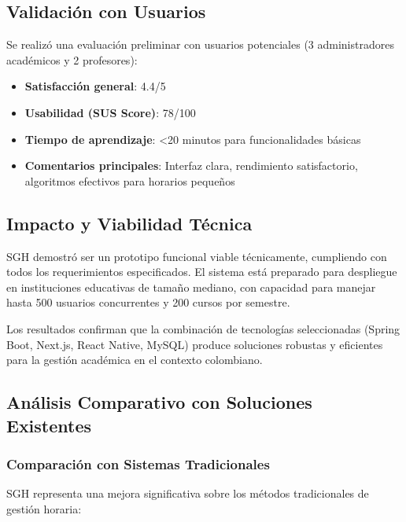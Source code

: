 \subsection{Validación con Usuarios}

Se realizó una evaluación preliminar con usuarios potenciales (3 administradores académicos y 2 profesores):

\begin{itemize}
\item \textbf{Satisfacción general}: 4.4/5
\item \textbf{Usabilidad (SUS Score)}: 78/100
\item \textbf{Tiempo de aprendizaje}: <20 minutos para funcionalidades básicas
\item \textbf{Comentarios principales}: Interfaz clara, rendimiento satisfactorio, algoritmos efectivos para horarios pequeños
\end{itemize}

\subsection{Impacto y Viabilidad Técnica}

SGH demostró ser un prototipo funcional viable técnicamente, cumpliendo con todos los requerimientos especificados. El sistema está preparado para despliegue en instituciones educativas de tamaño mediano, con capacidad para manejar hasta 500 usuarios concurrentes y 200 cursos por semestre.

Los resultados confirman que la combinación de tecnologías seleccionadas (Spring Boot, Next.js, React Native, MySQL) produce soluciones robustas y eficientes para la gestión académica en el contexto colombiano.

\subsection{Análisis Comparativo con Soluciones Existentes}

\subsubsection{Comparación con Sistemas Tradicionales}

SGH representa una mejora significativa sobre los métodos tradicionales de gestión horaria:

